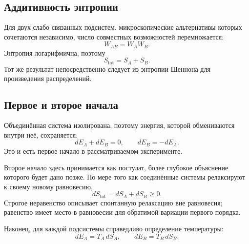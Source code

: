 \subsection{Аддитивность энтропии}

Для двух слабо связанных подсистем, микроскопические альтернативы которых сочетаются независимо, число совместных возможностей перемножается:
\[
 W_{AB}=W_AW_B.
\]
Энтропия логарифмична, поэтому
\begin{equation}
 S_{\mathrm{tot}}=S_A+S_B.
 \label{eq:sm2-entropy-additivity}
\end{equation}
Тот же результат непосредственно следует из энтропии Шеннона для произведения распределений.

\begin{classroomqa}
\end{classroomqa}

\subsection{Первое и второе начала}

Объединённая система изолирована, поэтому энергия, которой обмениваются внутри неё, сохраняется:
\begin{equation}
 dE_A+dE_B=0,
 \qquad
 dE_B=-dE_A.
 \label{eq:sm2-first-law}
\end{equation}
Это и есть первое начало в рассматриваемом эксперименте.

Второе начало здесь принимается как постулат, более глубокое объяснение которого будет дано позже.
По мере того как соединённые системы релаксируют к своему новому равновесию,
\begin{equation}
 dS_{\mathrm{tot}}=dS_A+dS_B\geq0.
 \label{eq:sm2-second-law}
\end{equation}
Строгое неравенство описывает спонтанную релаксацию вне равновесия; равенство имеет место в равновесии для обратимой вариации первого порядка.

Наконец, для каждой подсистемы справедливо определение температуры:
\begin{equation}
 dE_A=T_A\,dS_A,
 \qquad
 dE_B=T_B\,dS_B.
 \label{eq:sm2-two-temperatures}
\end{equation}

